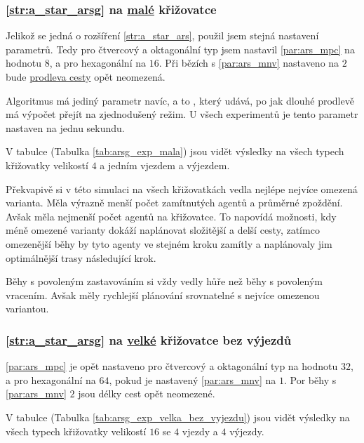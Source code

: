 \subsubsection{\ref{str:a_star_arsg} na \hyperref[par:data_mala]{malé} křižovatce}
\label{subsubsec:exp_arsg_mala_krizovatka}

Jelikož se jedná o rozšíření \ref{str:a_star_ars}, použil jsem stejná nastavení parametrů.
Tedy pro čtvercový a oktagonální typ jsem nastavil \ref{par:ars_mpc} na hodnotu $8$, a pro hexagonální na $16$.
Při bězích s \ref{par:ars_mnv} nastaveno na $2$ bude \hyperref[par:ars_mpc]{prodleva cesty} opět neomezená.

Algoritmus má jediný parametr navíc, a to , který udává,
po jak dlouhé prodlevě má výpočet přejít na zjednodušený režim.
U všech experimentů je tento parametr nastaven na jednu sekundu.

V tabulce (Tabulka \ref{tab:arsg_exp_mala}) jsou vidět výsledky na všech typech křižovatky
velikostí $4$ a jedním vjezdem a výjezdem.

Překvapivě si v této simulaci na všech křižovatkách vedla nejlépe nejvíce omezená varianta.
Měla výrazně menší počet zamítnutých agentů a průměrné zpoždění.
Avšak měla nejmenší počet agentů na křižovatce.
To napovídá možnosti, kdy méně omezené varianty dokáží naplánovat složitější a delší cesty,
zatímco omezenější běhy by tyto agenty ve stejném kroku zamítly a naplánovaly jim optimálnější trasy následující krok.

Běhy s povoleným zastavováním si vždy vedly hůře než běhy s povoleným vracením.
Avšak měly rychlejší plánování srovnatelné s nejvíce omezenou variantou.



\subsubsection{\ref{str:a_star_arsg} na \hyperref[par:data_velka]{velké} křižovatce bez výjezdů}
\label{subsubsec:exp_arsg_velka_krizovatka_bez_vyjezdu}

\ref{par:ars_mpc} je opět nastaveno pro čtvercový a oktagonální typ na hodnotu $32$,
a pro hexagonální na $64$, pokud je nastavený \ref{par:ars_mnv} na $1$.
Por běhy s \ref{par:ars_mnv} $2$ jsou délky cest opět neomezené.

V tabulce (Tabulka \ref{tab:arsg_exp_velka_bez_vyjezdu}) jsou vidět výsledky na všech typech křižovatky
velikostí $16$ se $4$ vjezdy a $4$ výjezdy.

